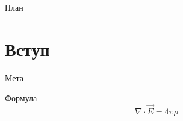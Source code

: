\documentclass[aspectratio=169, 12pt]{beamer}
\title{${title}}
\author{${ask:author}}
\institute{${ask:institute}}
\date{${date}}
\begin{document}
\begin{frame}
	\titlepage
\end{frame}

\begin{frame}{План}
	\tableofcontents
\end{frame}

\section{Вступ}

\begin{frame}{Мета}
\end{frame}

\begin{frame}{Формула}
	\[
		\nabla\cdot\vec{E} = 4\pi\rho
	\]
\end{frame}
\end{document}

